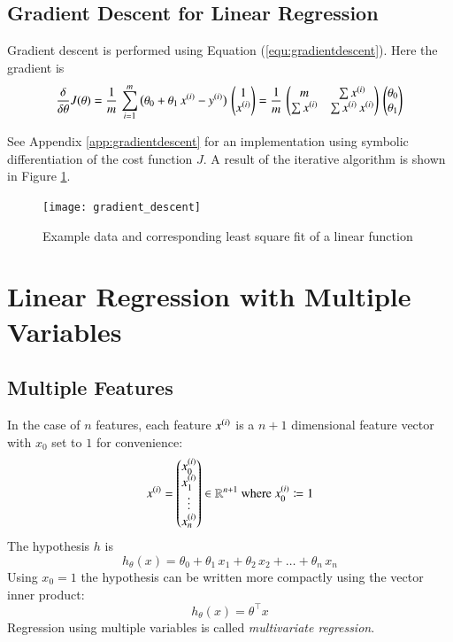 \documentclass[a4paper,twoside,10pt]{article}
\begin{document}
\subsection{Gradient Descent for Linear Regression}
Gradient descent is performed using Equation (\ref{equ:gradientdescent}). Here the gradient is
\begin{equation*}
  \frac{\delta}{\delta\theta}J(\theta)=
  \frac{1}{m}\,\displaystyle\sum_{i=1}^m\big(\theta_0+\theta_1\,x^{(i)}-y^{(i)}\big)\,\begin{pmatrix}1\\x^{(i)}\end{pmatrix}=
  \frac{1}{m}\,\begin{pmatrix}m&\sum x^{(i)}\\\sum x^{(i)}&\sum x^{(i)}\,x^{(i)}\end{pmatrix}\,
  \begin{pmatrix}\theta_0\\\theta_1\end{pmatrix}
\end{equation*}

See Appendix \ref{app:gradientdescent} for an implementation using symbolic differentiation of the cost function $J$.
A result of the iterative algorithm is shown in Figure \ref{fig:gradient_descent}.
\begin{figure}[htbp]
  \begin{center}
    \texttt{[image: gradient\_descent]}
    \caption{Example data and corresponding least square fit of a linear function\label{fig:gradient_descent}}
  \end{center}
\end{figure}

\section{Linear Regression with Multiple Variables}\label{cha:linearmulti}
\subsection{Multiple Features}
In the case of $n$ features, each feature $x^{(i)}$ is a $n+1$ dimensional feature vector with $x_0$ set to $1$ for convenience:
\begin{equation*}
  x^{(i)}=\begin{pmatrix}x^{(i)}_0\\x^{(i)}_1\\\vdots\\x^{(i)}_n\end{pmatrix}\in\mathbb{R}^{n+1}
  \mathrm{\ where\ }x^{(i)}_0\coloneqq 1
\end{equation*}
The hypothesis $h$ is
\begin{equation*}
  h_\theta(x)=\theta_0+\theta_1\,x_1+\theta_2\,x_2+\ldots+\theta_n\,x_n
\end{equation*}
Using $x_0=1$ the hypothesis can be written more compactly using the vector inner product:
\begin{equation*}
  h_\theta(x)=\theta^\top x
\end{equation*}
Regression using multiple variables is called \emph{multivariate regression}.
\end{document}
